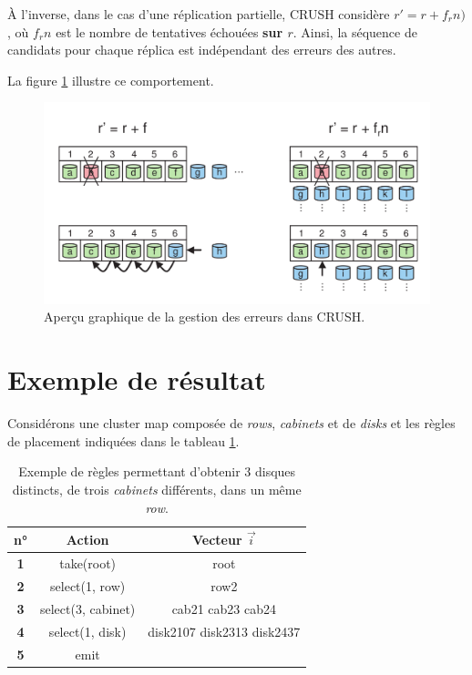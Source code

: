À l'inverse, dans le cas d'une réplication partielle, CRUSH considère $r' = r + f_{r}n)$, où $f_{r}n$ est le nombre de tentatives échouées \textbf{sur $r$}. Ainsi, la séquence de candidats pour chaque réplica est indépendant des erreurs des autres.

La figure \ref{chap3:CRUSH_error} illustre ce comportement.

\begin{figure}
  \centering
  \includegraphics[scale=0.35]{./images/remplacement_erreur.png}
  \caption{Aperçu graphique de la gestion des erreurs dans CRUSH.}
  \label{chap3:CRUSH_error}
\end{figure}

\section{Exemple de résultat}

Considérons une cluster map composée de \textit{rows}, \textit{cabinets} et de \textit{disks} et les règles de placement indiquées dans le tableau \ref{chap3:tabPlacementRules}.

\begin{table}[htb]
	\centering
  		\begin{tabular}{|c|c|c|}
           \hline
           \textbf{n°} & \textbf{Action} & Vecteur $\vec{i}$\\
           \hline
           \textbf{1} & take(root) & root  \\
           \hline
           \textbf{2} & select(1, row) & row2 \\
           \hline
           \textbf{3} & select(3, cabinet) & cab21 cab23 cab24 \\
           \hline
           \textbf{4} & select(1, disk) & disk2107 disk2313 disk2437\\
           \hline
           \textbf{5} & emit & \\
           \hline
  		\end{tabular}
        \caption{Exemple de règles permettant d'obtenir 3 disques distincts, de trois \textit{cabinets} différents, dans un même \textit{row}. \label{chap3:tabPlacementRules}}
\end{table}


